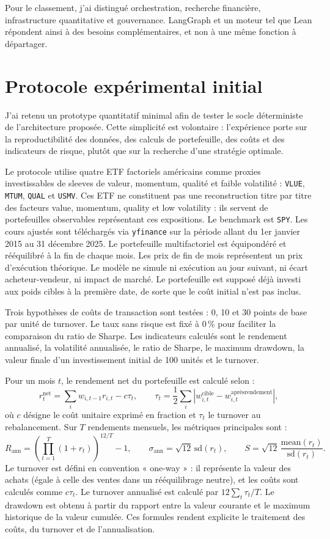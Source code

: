 Pour le classement, j'ai distingué orchestration, recherche financière, infrastructure quantitative et gouvernance. LangGraph et un moteur tel que Lean répondent ainsi à des besoins complémentaires, et non à une même fonction à départager.

\section{Protocole expérimental initial}

J'ai retenu un prototype quantitatif minimal afin de tester le socle déterministe de l'architecture proposée. Cette simplicité est volontaire : l'expérience porte sur la reproductibilité des données, des calculs de portefeuille, des coûts et des indicateurs de risque, plutôt que sur la recherche d'une stratégie optimale.

Le protocole utilise quatre ETF factoriels américains comme proxies investissables de sleeves de valeur, momentum, qualité et faible volatilité : \texttt{VLUE}, \texttt{MTUM}, \texttt{QUAL} et \texttt{USMV}. Ces ETF ne constituent pas une reconstruction titre par titre des facteurs value, momentum, quality et low volatility : ils servent de portefeuilles observables représentant ces expositions. Le benchmark est \texttt{SPY}. Les cours ajustés sont téléchargés via \texttt{yfinance} \citep{yfinance} sur la période allant du 1er janvier 2015 au 31 décembre 2025. Le portefeuille multifactoriel est équipondéré et rééquilibré à la fin de chaque mois. Les prix de fin de mois représentent un prix d'exécution théorique. Le modèle ne simule ni exécution au jour suivant, ni écart acheteur-vendeur, ni impact de marché. Le portefeuille est supposé déjà investi aux poids cibles à la première date, de sorte que le coût initial n'est pas inclus.

Trois hypothèses de coûts de transaction sont testées : 0, 10 et 30 points de base par unité de turnover. Le taux sans risque est fixé à 0\,\% pour faciliter la comparaison du ratio de Sharpe. Les indicateurs calculés sont le rendement annualisé, la volatilité annualisée, le ratio de Sharpe, le maximum drawdown, la valeur finale d'un investissement initial de 100 unités et le turnover.

Pour un mois $t$, le rendement net du portefeuille est calculé selon :
\[
r_t^{\mathrm{net}} = \sum_i w_{i,t-1}r_{i,t} - c\tau_t,
\qquad
\tau_t = \frac{1}{2}\sum_i\left|w^{\mathrm{cible}}_{i,t}-w^{\mathrm{après rendement}}_{i,t}\right|,
\]
où $c$ désigne le coût unitaire exprimé en fraction et $\tau_t$ le turnover au rebalancement. Sur $T$ rendements mensuels, les métriques principales sont :
\[
R_{\mathrm{ann}} = \left(\prod_{t=1}^{T}(1+r_t)\right)^{12/T}-1,
\qquad
\sigma_{\mathrm{ann}} = \sqrt{12}\,\mathrm{sd}(r_t),
\qquad
S = \sqrt{12}\,\frac{\mathrm{mean}(r_t)}{\mathrm{sd}(r_t)}.
\]
Le turnover est défini en convention « one-way » : il représente la valeur des achats (égale à celle des ventes dans un rééquilibrage neutre), et les coûts sont calculés comme $c\tau_t$. Le turnover annualisé est calculé par $12\sum_t\tau_t/T$. Le drawdown est obtenu à partir du rapport entre la valeur courante et le maximum historique de la valeur cumulée. Ces formules rendent explicite le traitement des coûts, du turnover et de l'annualisation.

